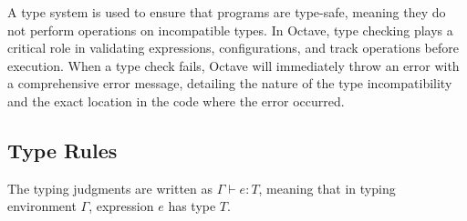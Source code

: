 \documentclass[letterpaper,12pt]{article}
\begin{document}
A type system is used to ensure that programs are type-safe, 
meaning they do not perform operations on incompatible types.
 In Octave, type checking plays a critical role in validating expressions, 
 configurations, and track operations before execution. When a type check fails, 
 Octave will immediately throw an error with a comprehensive error message, 
 detailing the nature of the type incompatibility and the exact location in the code where the
  error occurred. 

\subsection{Type Rules}

The typing judgments are written as \(\Gamma \vdash e : T\), meaning that in typing environment \(\Gamma\), expression \(e\) has type \(T\).
\end{document}
